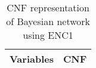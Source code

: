 \begin{table}[H]
\centering
\caption{CNF representation of Bayesian network using ENC1}
\label{cnfRepresentationEnc1}
\begin{tabular}{c|cl}
\hline
Variables & \multicolumn{2}{c}{CNF}                                                                                                                                                                                                                                                                                                                                                                                                                                                                                                                                                                                                                                                                                                                                                                                                                                                                                                                                                                                                                                                                                                                                                                                                                                                                                                                                                                                                                                                                                                                                        \\ \hline

\end{tabular}
\end{table}
